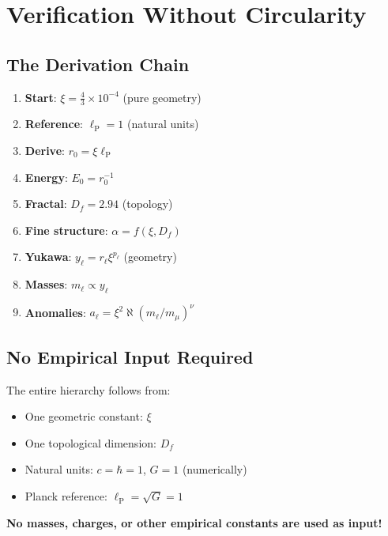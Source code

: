 \documentclass[12pt,a4paper]{article}
\newcommand{\lP}{\ell_{\text{P}}}
\newcommand{\rzero}{r_0}
\newcommand{\Ezero}{E_0}
\newcommand{\xipar}{\xi}  %
\begin{document}
	\section{Verification Without Circularity}
	
	\subsection{The Derivation Chain}
	
	\begin{enumerate}
		\item \textbf{Start}: $\xipar = \frac{4}{3} \times 10^{-4}$ (pure geometry)
		\item \textbf{Reference}: $\lP = 1$ (natural units)
		\item \textbf{Derive}: $\rzero = \xipar \lP$
		\item \textbf{Energy}: $\Ezero = \rzero^{-1}$
		\item \textbf{Fractal}: $D_f = 2.94$ (topology)
		\item \textbf{Fine structure}: $\alpha = f(\xipar, D_f)$
		\item \textbf{Yukawa}: $y_\ell = r_\ell \xipar^{p_\ell}$ (geometry)
		\item \textbf{Masses}: $m_\ell \propto y_\ell$
		\item \textbf{Anomalies}: $a_\ell = \xipar^2 \aleph (m_\ell/m_\mu)^\nu$
	\end{enumerate}
	
	\subsection{No Empirical Input Required}
	
	The entire hierarchy follows from:
	\begin{itemize}
		\item One geometric constant: $\xipar$
		\item One topological dimension: $D_f$
		\item Natural units: $c = \hbar = 1$, $G = 1$ (numerically)
		\item Planck reference: $\lP = \sqrt{G} = 1$
	\end{itemize}
	
	\textbf{No masses, charges, or other empirical constants are used as input!}
	
\end{document}
